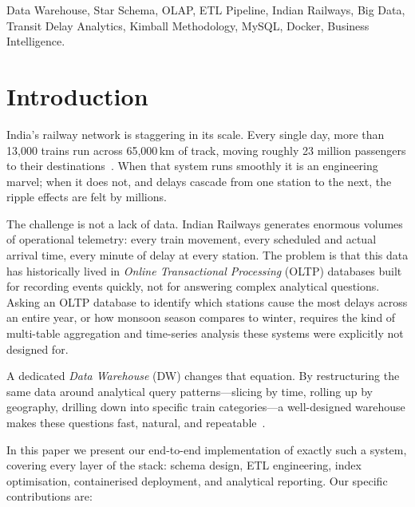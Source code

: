 \documentclass[conference]{IEEEtran}
\begin{document}
\begin{IEEEkeywords}
Data Warehouse, Star Schema, OLAP, ETL Pipeline, Indian Railways,
Big Data, Transit Delay Analytics, Kimball Methodology, MySQL,
Docker, Business Intelligence.
\end{IEEEkeywords}

\section{Introduction}

India's railway network is staggering in its scale.
Every single day, more than 13,000 trains run across 65,000\,km of track,
moving roughly 23 million passengers to their destinations~\cite{b1}.
When that system runs smoothly it is an engineering marvel; when it does
not, and delays cascade from one station to the next, the ripple effects
are felt by millions.

The challenge is not a lack of data.
Indian Railways generates enormous volumes of operational telemetry: every
train movement, every scheduled and actual arrival time, every minute of
delay at every station.
The problem is that this data has historically lived in
\textit{Online Transactional Processing} (OLTP) databases built for
recording events quickly, not for answering complex analytical questions.
Asking an OLTP database to identify which stations cause the most delays
across an entire year, or how monsoon season compares to winter, requires
the kind of multi-table aggregation and time-series analysis these systems
were explicitly not designed for.

A dedicated \textit{Data Warehouse} (DW) changes that equation.
By restructuring the same data around analytical query patterns---slicing
by time, rolling up by geography, drilling down into specific train
categories---a well-designed warehouse makes these questions fast, natural,
and repeatable~\cite{b2}.

In this paper we present our end-to-end implementation of exactly such a
system, covering every layer of the stack: schema design, ETL engineering,
index optimisation, containerised deployment, and analytical reporting.
Our specific contributions are:
\end{document}
